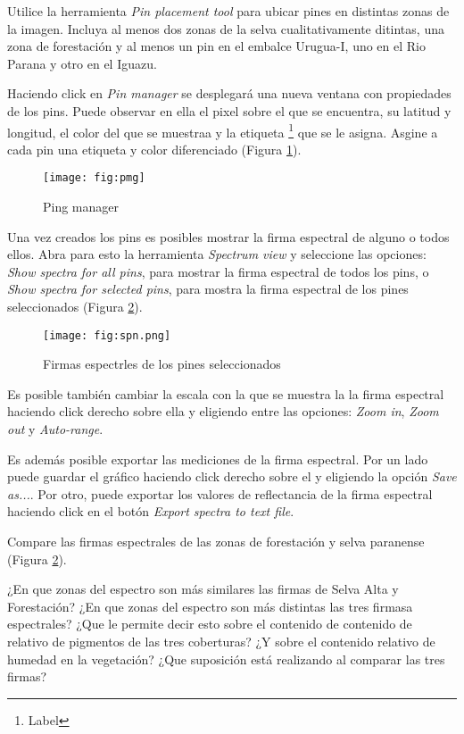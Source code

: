 Utilice la herramienta \emph{Pin placement tool} para ubicar pines en distintas zonas de la imagen. Incluya al menos dos zonas de la selva cualitativamente ditintas, una zona de forestación y al menos un pin en el embalce Urugua-I, uno en el Rio Parana y otro en el Iguazu.

Haciendo click en \emph{Pin manager} se desplegará una nueva ventana  con propiedades de los pins. Puede observar en ella el pixel sobre el que se encuentra, su latitud y longitud, el color del que se muestraa y la etiqueta \footnote{Label} que se le asigna. Asgine a cada pin una etiqueta y color diferenciado (Figura \ref{fig:pmg}).

\begin{figure}[h!]
    \centering
    \texttt{[image: fig:pmg]}
    \caption{Ping manager}
    \label{fig:pmg}
\end{figure}

Una vez creados los pins es posibles mostrar la firma espectral de alguno o todos ellos. Abra para esto la herramienta \emph{Spectrum view} y seleccione las opciones: \emph{Show spectra for all pins}, para mostrar la firma espectral de todos los pins, o \emph{Show spectra for selected pins}, para mostra la firma espectral de los pines seleccionados (Figura \ref{fig:spn}).

\begin{figure}[h!]
    \centering
    \texttt{[image: fig:spn.png]}
    \caption{Firmas espectrles de los pines seleccionados}
    \label{fig:spn}
\end{figure}

Es posible también cambiar la escala con la que se muestra la la firma espectral haciendo click derecho sobre ella y eligiendo entre las opciones: \emph{Zoom in}, \emph{Zoom out} y \emph{Auto-range}.

Es además posible exportar las mediciones de la firma espectral. Por un lado puede guardar el gráfico haciendo click derecho sobre el y eligiendo la opción \emph{Save as...}. Por otro, puede exportar los valores de reflectancia de la firma espectral haciendo click en el botón \emph{Export spectra to text file}.

Compare las firmas espectrales de las zonas de forestación y selva paranense (Figura \ref{fig:spn}).

\begin{que}
    ¿En que zonas del espectro son más similares las firmas de Selva Alta y Forestación? ¿En que zonas del espectro son más distintas las tres firmasa espectrales? ¿Que le permite decir esto sobre el contenido de contenido de relativo de pigmentos de las tres coberturas? ¿Y sobre el contenido relativo de humedad en la vegetación? ¿Que suposición está realizando al comparar las tres firmas?
\end{que}

